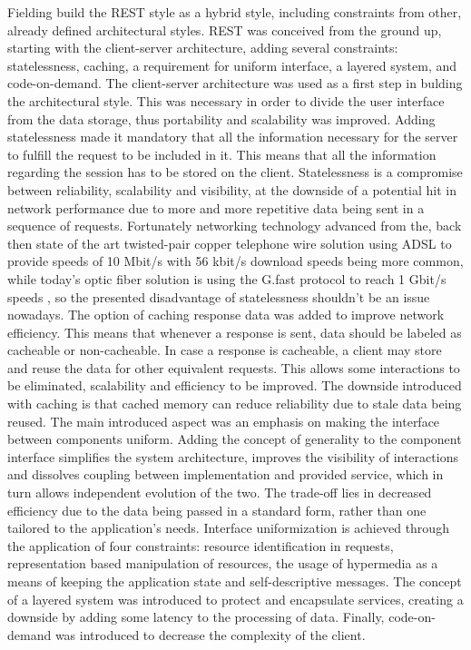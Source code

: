 \documentclass[12pt,a4paper,twoside]{report}
\begin{document}
Fielding build the REST style as a hybrid style, including constraints from other, already defined architectural styles. REST was conceived from the ground up, starting with the client-server architecture, adding several constraints: statelessness, caching, a requirement for uniform interface, a layered system, and code-on-demand. The client-server architecture was used as a first step in bulding the architectural style. This was necessary in order to divide the user interface from the data storage, thus portability and scalability was improved. Adding statelessness made it mandatory that all the information necessary for the server to fulfill the request to be included in it. This means that all the information regarding the session has to be stored on the client. Statelessness is a compromise between reliability, scalability and visibility, at the downside of a potential hit in network performance due to more and more repetitive data being sent in a sequence of requests. Fortunately networking technology advanced from the, back then state of the art twisted-pair copper telephone wire solution using ADSL to provide speeds of 10 Mbit/s with 56 kbit/s download speeds being more common, while today's optic fiber solution is using the G.fast protocol to reach 1 Gbit/s speeds \cite{historical_net_speeds}, so the presented disadvantage of statelessness shouldn't be an issue nowadays. The option of caching response data was added to improve network efficiency. This means that whenever a response is sent, data should be labeled as cacheable or non-cacheable. In case a response is cacheable, a client may store and reuse the data for other equivalent requests. This allows some interactions to be eliminated, scalability and efficiency to be improved. The downside introduced with caching is that cached memory can reduce reliability due to stale data being reused. The main introduced aspect was an emphasis on making the interface between components uniform. Adding the concept of generality to the component interface simplifies the system architecture, improves the visibility of interactions and dissolves coupling between implementation and provided service, which in turn allows independent evolution of the two. The trade-off lies in decreased efficiency due to the data being passed in a standard form, rather than one tailored to the application's needs. Interface uniformization is achieved through the application of four constraints: resource identification in requests, representation based manipulation of resources, the usage of hypermedia as a means of keeping the application state and self-descriptive messages. The concept of a layered system was introduced to protect and encapsulate services, creating a downside by adding some latency to the processing of data. Finally, code-on-demand was introduced to decrease the complexity of the client.
\end{document}
